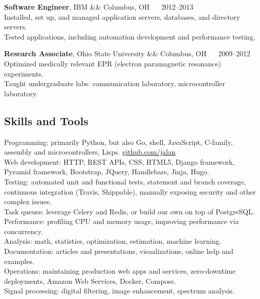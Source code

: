 \documentclass[12pt]{report}
\makeatletter
\renewcommand{\bullet}{$\vcenter{\hbox{~\huge$\cdot$~}}$}
\newenvironment{jobhead}
{\tabularx{\textwidth}{ @{} l X r @{} }}
{\endtabularx}
\newenvironment{bullets}
{\tabularx{\textwidth}{ @{\bullet} X @{} }}
{\endtabularx}
\makeatother
\begin{document}
\begin{jobhead}
\textbf{Software Engineer}, IBM && Columbus, OH ~~ 2012--2013 \\
\end{jobhead}
\begin{bullets}
Installed, set up, and managed application servers, databases, and directory servers. \\
Tested applications, including automation development and performance testing. \\
\end{bullets}

\begin{jobhead}
\textbf{Research Associate}, Ohio State University && Columbus, OH ~~ 2009--2012 \\
\end{jobhead}
\begin{bullets}
Optimized medically relevant EPR (electron paramagnetic resonance) experiments. \\
Taught undergraduate labs: communication laboratory, microcontroller laboratory. \\
\end{bullets}

\subsection*{Skills and Tools}
\begin{bullets}
Programming: primarily Python, but also Go, shell, JavaScript, C-family, assembly and microcontrollers, Lisps. \href{https://github.com/jalan}{github.com/jalan} \\
Web development: HTTP, REST APIs, CSS, HTML5, Django framework, Pyramid framework, Bootstrap, JQuery, Handlebars, Jinja, Hugo. \\
Testing: automated unit and functional tests, statement and branch coverage, continuous integration (Travis, Shippable), manually exposing security and other complex issues. \\
Task queues: leverage Celery and Redis, or build our own on top of PostgreSQL. \\
Performance: profiling CPU and memory usage, improving performance via concurrency. \\
Analysis: math, statistics, optimization, estimation, machine learning. \\
Documentation: articles and presentations, visualizations, online help and examples. \\
Operations: maintaining production web apps and services, zero-downtime deployments, Amazon Web Services, Docker, Compose. \\
Signal processing: digital filtering, image enhancement, spectrum analysis. \\
\end{bullets}
\end{document}
